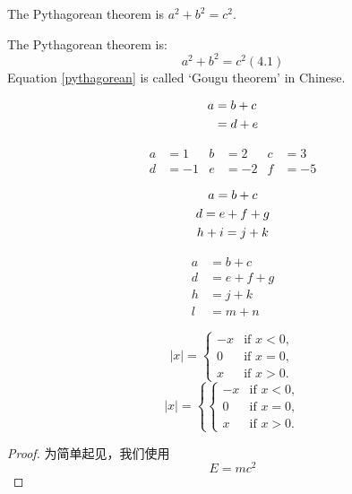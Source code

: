

The Pythagorean theorem is $a^2 + b^2 = c^2$.

The Pythagorean theorem is:
\begin{equation}
	a^2 + b^2 = c^2 \label{pythagorean}%
	(4.1)
\end{equation}
Equation \eqref{pythagorean} is called ‘Gougu theorem’ in Chinese.


\begin{align}
	a & = b + c \notag \\ %
	& = d + e
\end{align}

\begin{align}
	a &=1 & b &=2 & c &=3\\
	d &=-1 & e &=-2 & f &=-5
\end{align}

\begin{gather}
	a = b + c \\
	d = e + f + g \\
	h + i = j + k \notag \\
\end{gather}

\begin{equation}
	\begin{aligned}
		a &= b + c \\
		d &= e + f + g \\
		h &= j + k \\
		l &= m+n
	\end{aligned}
\end{equation}


\begin{equation}
	|x| = \left\{
	\begin{array}{rl}
		-x & \text{if } x < 0,\\
		0 & \text{if } x = 0,\\
		x & \text{if } x > 0.
	\end{array} \right.
\end{equation}
\begin{equation}
	|x| = \left\{
	\begin{cases}
		-x & \text{if } x < 0,\\
		0 & \text{if } x = 0,\\
		x & \text{if } x > 0.
	\end{cases}
\end{equation}

\begin{proof}
	为简单起见，我们使用 
	$$E=mc^2$$
\end{proof}